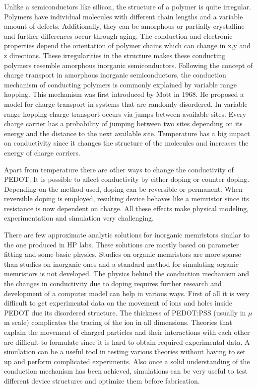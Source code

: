\begin{doublespace}
Unlike a semiconductors like silicon, the structure of a polymer is quite irregular. Polymers have individual molecules with different chain lengths and a variable amount of defects.
Additionally, they can be amorphous or partially crystalline and further differences occur through aging. The conduction and electronic properties depend the orientation of polymer chains which can change in x,y and z directions. These irregularities in the structure makes these conducting polymers resemble amorphous inorganic semiconductors. Following the concept of charge transport in amorphous inorganic semiconductors, the conduction mechanism of conducting polymers is commonly explained by variable range hopping. This mechanism was first introduced by Mott in 1968. He proposed a model for charge transport in systems that are randomly disordered. In variable range hopping charge transport occurs via jumps between available sites. Every charge carrier has a probability of jumping between two sites depending on its energy and the distance to the next available site. Temperature has a big impact on conductivity since it changes the structure of the molecules and increases the energy of charge carriers.

Apart from temperature there are other ways to change the conductivity of PEDOT. It is possible to affect conductivity by either doping or counter doping. Depending on the method used, doping can be reversible or permanent. When reversible doping is employed, resulting device behaves like a memristor since its resistance is now dependent on charge. All these effects make physical modeling, experimentation and simulation very challenging. 

There are few approximate analytic solutions for inorganic memristors similar to the one produced in HP labs. These solutions are mostly based on parameter fitting and some basic physics. Studies on organic memristors are more sparse than studies on inorganic ones and a standard method for simulating organic memristors is not developed. The physics behind the conduction mechanism and the changes in conductivity due to doping requires further research and development of a computer model can help in various ways. First of all it is very difficult to get experimental data on the movement of ions and holes inside PEDOT due its disordered structure. The thickness of PEDOT:PSS (usually in $\mu$m scale) complicates the tracing of the ion in all dimensions. Theories that explain the movement of charged particles and their interactions with each other are difficult to formulate since it is hard to obtain required experimental data. A simulation can be a useful tool in testing various theories without having to set up and perform complicated experiments. Also once a solid understanding of the conduction mechanism has been achieved, simulations can be very useful to test different device structures and optimize them before fabrication. 


 \end{doublespace}